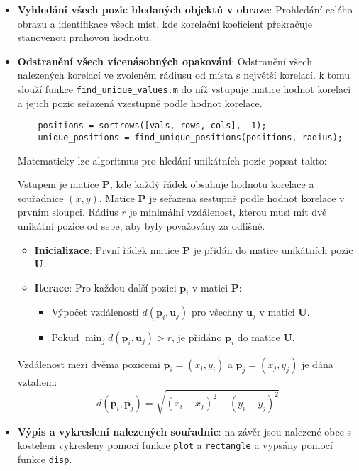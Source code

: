 \begin{itemize}
    \item \textbf{Vyhledání všech pozic hledaných objektů v obraze}: Prohledání celého obrazu a identifikace všech míst, kde korelační koeficient překračuje stanovenou prahovou hodnotu.

    \item \textbf{Odstranění všech vícenásobných opakování}: Odstranění všech nalezených korelací ve zvoleném rádiusu od místa s největší korelací. k tomu slouží funkce \texttt{find\_unique\_values.m} do níž vstupuje matice hodnot korelací a jejich pozic seřazená vzestupně podle hodnot korelace.
    \begin{verbatim}
    positions = sortrows([vals, rows, cols], -1);
    unique_positions = find_unique_positions(positions, radius);
    \end{verbatim}

    Matematicky lze algoritmus pro hledání unikátních pozic popsat takto:
    
    Vstupem je matice \(\mathbf{P}\), kde každý řádek obsahuje hodnotu korelace a souřadnice \((x, y)\). Matice \(\mathbf{P}\) je seřazena sestupně podle hodnot korelace v prvním sloupci. Rádius \(r\) je minimální vzdálenost, kterou musí mít dvě unikátní pozice od sebe, aby byly považovány za odlišné.
    
    \begin{itemize}
        \item \textbf{Inicializace}: První řádek matice \(\mathbf{P}\) je přidán do matice unikátních pozic \(\mathbf{U}\).
        \item \textbf{Iterace}: Pro každou další pozici \(\mathbf{p}_i\) v matici \(\mathbf{P}\):
        \begin{itemize}
            \item Výpočet vzdálenosti \(d(\mathbf{p}_i, \mathbf{u}_j)\) pro všechny \(\mathbf{u}_j\) v matici \(\mathbf{U}\).
            \item Pokud \(\min_j d(\mathbf{p}_i, \mathbf{u}_j) > r\), je přidáno \(\mathbf{p}_i\) do matice \(\mathbf{U}\).
        \end{itemize}
    \end{itemize}
    
    Vzdálenost mezi dvěma pozicemi \(\mathbf{p}_i = (x_i, y_i)\) a \(\mathbf{p}_j = (x_j, y_j)\) je dána vztahem:
    \[
    d(\mathbf{p}_i, \mathbf{p}_j) = \sqrt{(x_i - x_j)^2 + (y_i - y_j)^2}
    \]
    
    \item \textbf{Výpis a vykreslení nalezených souřadnic}: na závěr jsou nalezené obce s kostelem vykresleny pomocí funkce \texttt{plot} a \texttt{rectangle} a vypsány pomocí funkce \texttt{disp}.

\end{itemize}